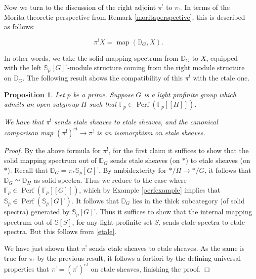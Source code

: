 \documentclass[12pt]{article}
\newtheorem{proposition}[theorem]{Proposition}
\newcommand{\on}{\operatorname}
\newcommand{\solid}{\square}
\newcommand{\wh}{\widehat}
\begin{document}
Now we turn to the discussion of the right adjoint $\pi^!$ to $\pi_!$.  In terms of the Morita-theoretic perspective from Remark \ref{moritaperspective}, this is described as follows:

$$\pi^!X = \on{map}(\mathbb{D}_G,X).$$

In other words, we take the solid mapping spectrum from $\mathbb{D}_G$ to $X$, equipped with the left $\mathbb{S}_{\wh{p}}[G]^\solid$-module structure coming from the right module structure on $\mathbb{D}_G$.  The following result shows the compatibility of this $\pi^!$ with the etale one.

\begin{proposition}
Let $p$ be a prime.  Suppose $G$ is a light profinite group which admits an open subgroup $H$ such that $\mathbb{F}_p\in\on{Perf}(\mathbb{F}_p[[H]])$.

We have that $\pi^!$ sends etale sheaves to etale sheaves, and the canonical comparison map $(\pi^!)^{et}\to\pi^!$ is an isomorphism on etale sheaves.
\end{proposition}
\begin{proof}
By the above formula for $\pi^!$, for the first claim it suffices to show that the solid mapping spectrum out of $\mathbb{D}_G$ sends etale sheaves (on $\ast$) to etale sheaves (on $\ast$).  Recall that $\mathbb{D}_G = \pi_\ast \mathbb{S}_{\wh{p}}[G]^\solid$.  By ambidexterity for $\ast/H\to\ast/G$, it follows that $\mathbb{D}_G\simeq\mathbb{D}_H$ as solid spectra.  Thus we reduce to the case where $\mathbb{F}_p\in\on{Perf}(\mathbb{F}_p[[G]])$, which by Example \ref{perfexample} implies that $\mathbb{S}_{\wh{p}}\in\on{Perf}(\mathbb{S}_{\wh{p}}[G]^\solid)$.  It follows that $\mathbb{D}_G$ lies in the thick subcategory (of solid spectra) generated by $\mathbb{S}_{\wh{p}}[G]^\solid$.  Thus it suffices to show that the internal mapping spectrum out of $\mathbb{S}[S]$, for any light profinite set $S$, sends etale spectra to etale spectra.  But this follows from \ref{etale}.

We have just shown that $\pi^!$ sends etale sheaves to etale sheaves.  As the same is true for $\pi_!$ by the previous result, it follows a fortiori by the defining universal properties that $\pi^!=(\pi^!)^{et}$ on etale sheaves, finishing the proof.
\end{proof}
\end{document}
